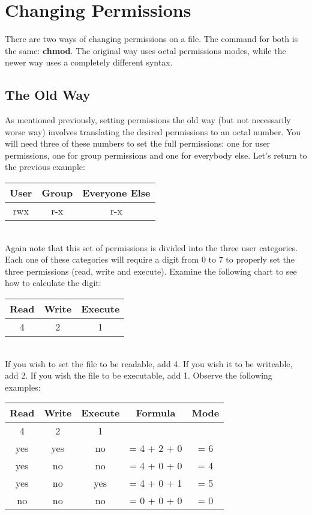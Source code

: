 \section{Changing Permissions}

There are two ways of changing permissions on a file.  The command for both is the same: \textbf{chmod}.  The original way uses octal permissions modes, while the newer way uses a completely different syntax.

\subsection{The Old Way}

As mentioned previously, setting permissions the old way (but not necessarily worse way) involves translating the desired permissions to an octal number.  You will need three of these numbers to set the full permissions: one for user permissions, one for group permissions and one for everybody else.  Let's return to the previous example:\\

\begin{tabular}{|c|c|c|}
   \hline
   User & Group & Everyone Else \\
   \hline
   rwx & r-x & r-x \\
   \hline
\end{tabular} \\

Again note that this set of permissions is divided into the three user categories.  Each one of these categories will require a digit from 0 to 7 to properly set the three permissions (read, write and execute).  Examine the following chart to see how to calculate the digit:\\

\begin{tabular}{|c|c|c|}
   \hline
   Read & Write & Execute \\
   \hline
   4 & 2 & 1 \\
   \hline
\end{tabular} \\

If you wish to set the file to be readable, add 4.  If you wish it to be writeable, add 2.  If you wish the file to be executable, add 1.  Observe the following examples:\\

\begin{tabular}{|c|c|c||c||c|}
   \hline
   Read & Write & Execute & Formula & Mode\\
   \hline
   4 & 2 & 1 &  &  \\
   \hline
   yes & yes & no & = 4 + 2 + 0 & = 6 \\
   \hline
   yes & no & no & = 4 + 0 + 0 & = 4 \\
   \hline
   yes & no & yes & = 4 + 0 + 1 & = 5 \\
   \hline
   no & no & no & = 0 + 0 + 0 & = 0 \\
   \hline
\end{tabular}

